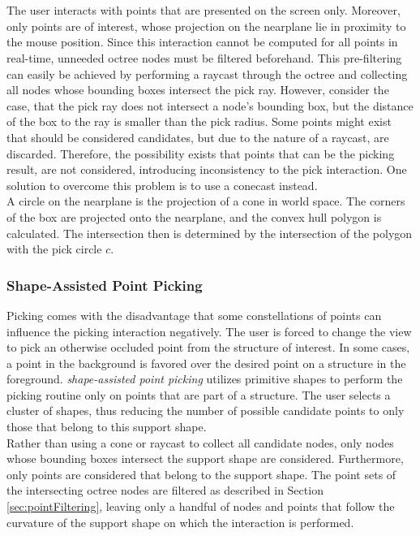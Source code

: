 \\
\\
The user interacts with points that are presented on the screen only. Moreover, only points are of interest, whose projection on the nearplane lie in proximity to the mouse position. Since this interaction cannot be computed for all points in real-time, unneeded octree nodes must be filtered beforehand. This pre-filtering can easily be achieved by performing a raycast through the octree and collecting all nodes whose bounding boxes intersect the pick ray. However, consider the case, that the pick ray does not intersect a node's bounding box, but the distance of the box to the ray is smaller than the pick radius. Some points might exist that should be considered candidates, but due to the nature of a raycast, are discarded. Therefore, the possibility exists that points that can be the picking result, are not considered, introducing inconsistency to the pick interaction. One solution to overcome this problem is to use a conecast instead. 
\\
A circle on the nearplane is the projection of a cone in world space. The corners of the box are projected onto the nearplane, and the convex hull polygon is calculated. The intersection then is determined by the intersection of the polygon with the pick circle $c$. 


\subsubsection{Shape-Assisted Point Picking}
\label {sec:picking_assisted}

Picking comes with the disadvantage that some constellations of points can influence the picking interaction negatively. The user is forced to change the view to pick an otherwise occluded point from the structure of interest. In some cases, a point in the background is favored over the desired point on a structure in the foreground. \textit{shape-assisted point picking} utilizes primitive shapes to perform the picking routine only on points that are part of a structure. The user selects a cluster of shapes, thus reducing the number of possible candidate points to only those that belong to this support shape. 
\\ 
Rather than using a cone or raycast to collect all candidate nodes, only nodes whose bounding boxes intersect the support shape are considered. Furthermore, only points are considered that belong to the support shape. The point sets of the intersecting octree nodes are filtered as described in Section \ref{sec:pointFiltering}, leaving only a handful of nodes and points that follow the curvature of the support shape on which the interaction is performed. 

